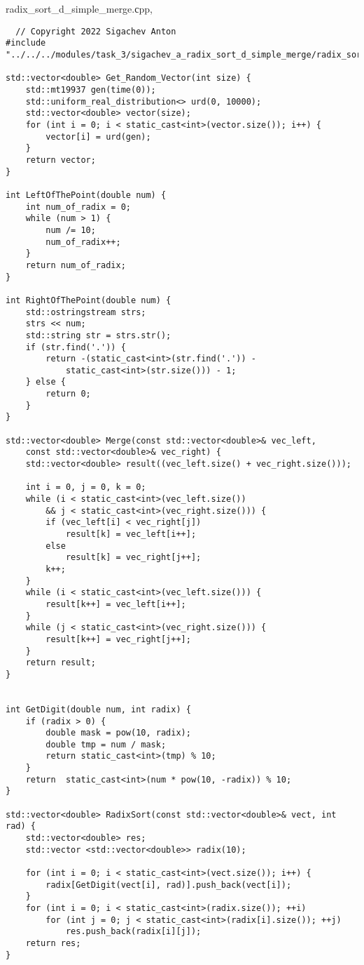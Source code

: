\documentclass[12pt,a4paper]{article}
\begin{document}
\section{} radix\_sort\_d\_simple\_merge.сpp,
\begin{lstlisting}
  // Copyright 2022 Sigachev Anton
#include "../../../modules/task_3/sigachev_a_radix_sort_d_simple_merge/radix_sort_d_simple_merge.h"

std::vector<double> Get_Random_Vector(int size) {
    std::mt19937 gen(time(0));
    std::uniform_real_distribution<> urd(0, 10000);
    std::vector<double> vector(size);
    for (int i = 0; i < static_cast<int>(vector.size()); i++) {
        vector[i] = urd(gen);
    }
    return vector;
}

int LeftOfThePoint(double num) {
    int num_of_radix = 0;
    while (num > 1) {
        num /= 10;
        num_of_radix++;
    }
    return num_of_radix;
}

int RightOfThePoint(double num) {
    std::ostringstream strs;
    strs << num;
    std::string str = strs.str();
    if (str.find('.')) {
        return -(static_cast<int>(str.find('.')) -
            static_cast<int>(str.size())) - 1;
    } else {
        return 0;
    }
}

std::vector<double> Merge(const std::vector<double>& vec_left,
    const std::vector<double>& vec_right) {
    std::vector<double> result((vec_left.size() + vec_right.size()));

    int i = 0, j = 0, k = 0;
    while (i < static_cast<int>(vec_left.size())
        && j < static_cast<int>(vec_right.size())) {
        if (vec_left[i] < vec_right[j])
            result[k] = vec_left[i++];
        else
            result[k] = vec_right[j++];
        k++;
    }
    while (i < static_cast<int>(vec_left.size())) {
        result[k++] = vec_left[i++];
    }
    while (j < static_cast<int>(vec_right.size())) {
        result[k++] = vec_right[j++];
    }
    return result;
}


int GetDigit(double num, int radix) {
    if (radix > 0) {
        double mask = pow(10, radix);
        double tmp = num / mask;
        return static_cast<int>(tmp) % 10;
    }
    return  static_cast<int>(num * pow(10, -radix)) % 10;
}

std::vector<double> RadixSort(const std::vector<double>& vect, int rad) {
    std::vector<double> res;
    std::vector <std::vector<double>> radix(10);

    for (int i = 0; i < static_cast<int>(vect.size()); i++) {
        radix[GetDigit(vect[i], rad)].push_back(vect[i]);
    }
    for (int i = 0; i < static_cast<int>(radix.size()); ++i)
        for (int j = 0; j < static_cast<int>(radix[i].size()); ++j)
            res.push_back(radix[i][j]);
    return res;
}


\end{lstlisting}
\end{document}
